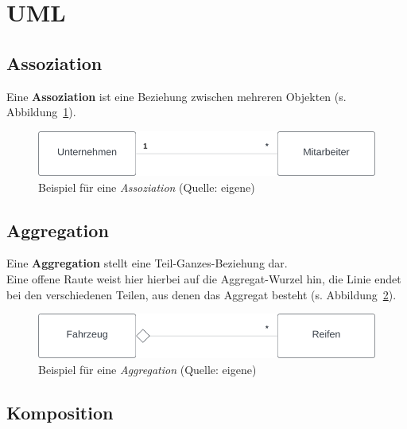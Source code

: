 \section{UML}


\subsection{Assoziation}

Eine \textbf{Assoziation} ist eine Beziehung zwischen mehreren Objekten (s. Abbildung~\ref{fig:association}).

\begin{figure}
    \begin{center}
        \includegraphics[scale=0.5]{chapters/OOP/img/association}
        \caption{Beispiel für eine \textit{Assoziation} (Quelle: eigene)}
        \label{fig:association}
    \end{center}
\end{figure}

\subsection{Aggregation}


Eine \textbf{Aggregation} stellt eine Teil-Ganzes-Beziehung dar.\\
Eine offene Raute weist hier hierbei auf die Aggregat-Wurzel hin, die Linie endet bei den verschiedenen Teilen, aus denen das Aggregat besteht (s. Abbildung~\ref{fig:aggregation}).

\begin{figure}
    \begin{center}
        \includegraphics[scale=0.5]{chapters/OOP/img/aggregation}
        \caption{Beispiel für eine \textit{Aggregation} (Quelle: eigene)}
        \label{fig:aggregation}
    \end{center}
\end{figure}

\subsection{Komposition}

